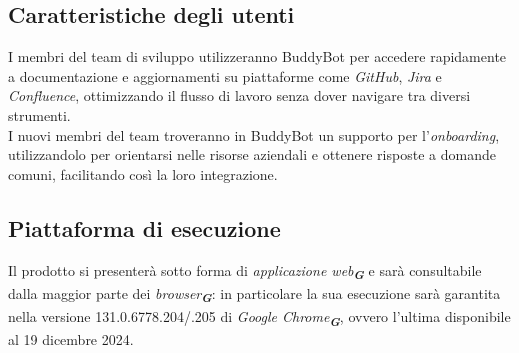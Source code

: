 \subsection{Caratteristiche degli utenti}
I membri del team di sviluppo utilizzeranno BuddyBot per accedere rapidamente a documentazione e aggiornamenti su piattaforme come 
\emph{GitHub}, \emph{Jira} e \emph{Confluence}, ottimizzando il flusso di lavoro senza dover navigare tra diversi strumenti.\\
I nuovi membri del team troveranno in BuddyBot un supporto per l'\emph{onboarding}, utilizzandolo per 
orientarsi nelle risorse aziendali e ottenere risposte a domande comuni, facilitando così la loro integrazione.

\subsection{Piattaforma di esecuzione}
Il prodotto si presenterà sotto forma di \emph{applicazione web}\textsubscript{\textit{\textbf{G}}} e sarà consultabile dalla maggior
parte dei \emph{browser}\textsubscript{\textit{\textbf{G}}}: in particolare la sua esecuzione sarà garantita nella versione 131.0.6778.204/.205 di \emph{Google Chrome}\textsubscript{\textit{\textbf{G}}}, ovvero l'ultima disponibile al 19 dicembre 2024.
